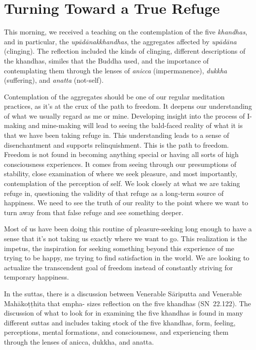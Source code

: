 
\chapter{Turning Toward a True Refuge}

This morning, we received a teaching on the contemplation of the five \emph{khandhas}, and in particular, the \emph{upādānakkhandhas}, the aggregates affected by \emph{upādāna} (clinging). The reflection included the kinds of clinging, different descriptions of the khandhas, similes that the Buddha used, and the importance of contemplating them through the lenses of \emph{anicca} (impermanence), \emph{dukkha} (suffering), and \emph{anatta} (not-self).

Contemplation of the aggregates should be one of our regular meditation practices, as it's at the crux of the path to freedom. It deepens our understanding of what we usually regard as me or mine. Developing insight into the process of I-making and mine-making will lead to seeing the bald-faced reality of what it is that we have been taking refuge in. This understanding leads to a sense of disenchantment and supports relinquishment. This is the path to freedom. Freedom is not found in becoming anything special or having all sorts of high consciousness experiences. It comes from seeing through our presumptions of stability, close examination of where we seek pleasure, and most importantly, contemplation of the perception of self. We look closely at what we are taking refuge in, questioning the validity of that refuge as a long-term source of happiness. We need to see the truth of our reality to the point where we want to turn away from that false refuge and see something deeper.

Most of us have been doing this routine of pleasure-seeking long enough to have a sense that it's not taking us exactly where we want to go. This realization is the impetus, the inspiration for seeking something beyond this experience of me trying to be happy, me trying to find satisfaction in the world. We are looking to actualize the transcendent goal of freedom instead of constantly striving for temporary happiness.

In the suttas, there is a discussion between Venerable Sāriputta and Venerable Mahākoṭṭhita that empha- \linebreak sizes reflection on the five khandhas \mbox{(SN 22.122)}. The discussion of what to look for in examining the five khandhas is found in many different suttas and includes taking stock of the five khandhas, form, feeling, perceptions, mental formations, and consciousness, and experiencing them through the lenses of anicca, dukkha, and anatta.

